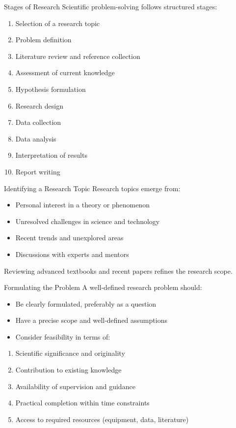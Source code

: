 \begin{frame}{Stages of Research}
  Scientific problem-solving follows structured stages:
  \begin{enumerate}
    \item Selection of a research topic
    \item Problem definition
    \item Literature review and reference collection
    \item Assessment of current knowledge
    \item Hypothesis formulation
    \item Research design
    \item Data collection
    \item Data analysis
    \item Interpretation of results
    \item Report writing
  \end{enumerate}
\end{frame}

\begin{frame}{Identifying a Research Topic}
  Research topics emerge from:
  \begin{itemize}
    \item Personal interest in a theory or phenomenon
    \item Unresolved challenges in science and technology
    \item Recent trends and unexplored areas
    \item Discussions with experts and mentors
  \end{itemize}
  Reviewing advanced textbooks and recent papers refines the research scope.
\end{frame}

\begin{frame}{Formulating the Problem}
  A well-defined research problem should:
  \begin{itemize}
    \item Be clearly formulated, preferably as a question
    \item Have a precise scope and well-defined assumptions
    \item Consider feasibility in terms of:
  \end{itemize}
  \begin{enumerate}
    \item Scientific significance and originality
    \item Contribution to existing knowledge
    \item Availability of supervision and guidance
    \item Practical completion within time constraints
    \item Access to required resources (equipment, data, literature)
  \end{enumerate}
\end{frame}

